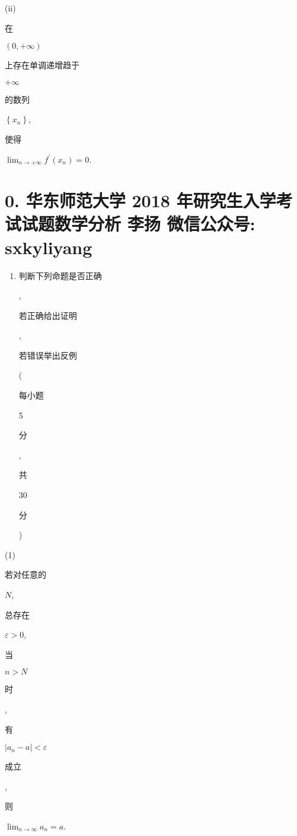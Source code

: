 \documentclass[10pt]{article}
\begin{document}
(ii) \begin{CJK}{UTF8}{mj}在\end{CJK} $(0,+\infty)$ \begin{CJK}{UTF8}{mj}上存在单调递增趋于\end{CJK} $+\infty$ \begin{CJK}{UTF8}{mj}的数列\end{CJK} $\left\{x_{n}\right\}$, \begin{CJK}{UTF8}{mj}使得\end{CJK} $\lim _{n \rightarrow+\infty} f^{\prime}\left(x_{n}\right)=0$.

\section{0. 华东师范大学 2018 年研究生入学考试试题数学分析 
 李扬 
 微信公众号: sxkyliyang}
\begin{enumerate}
  \item \begin{CJK}{UTF8}{mj}判断下列命题是否正确\end{CJK}, \begin{CJK}{UTF8}{mj}若正确给出证明\end{CJK}, \begin{CJK}{UTF8}{mj}若错误举出反例\end{CJK} (\begin{CJK}{UTF8}{mj}每小题\end{CJK} 5 \begin{CJK}{UTF8}{mj}分\end{CJK}, \begin{CJK}{UTF8}{mj}共\end{CJK} 30 \begin{CJK}{UTF8}{mj}分\end{CJK})
\end{enumerate}
(1) \begin{CJK}{UTF8}{mj}若对任意的\end{CJK} $N$, \begin{CJK}{UTF8}{mj}总存在\end{CJK} $\varepsilon>0$, \begin{CJK}{UTF8}{mj}当\end{CJK} $n>N$ \begin{CJK}{UTF8}{mj}时\end{CJK}, \begin{CJK}{UTF8}{mj}有\end{CJK} $\left|a_{n}-a\right|<\varepsilon$ \begin{CJK}{UTF8}{mj}成立\end{CJK}, \begin{CJK}{UTF8}{mj}则\end{CJK} $\lim _{n \rightarrow \infty} a_{n}=a$.
\end{document}
